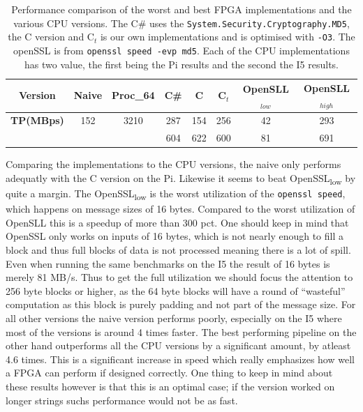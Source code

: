 \documentclass[a4paper, openany]{book}
\begin{document}
\begin{table}[!htb]
\centering
\captionsetup{width=.8\linewidth}
\begin{tabular}{c c c c c c c c}
\hline
\textbf{Version} & Naive & Proc_{64} & C\# & C & C$_{t}$ & OpenSLL$_{low}$ & OpenSLL$_{high}$\\
\hline
\textbf{TP(MBps)} & 152 & 3210 & 287 & 154 & 256 & 42 & 293\\
 & & & 604 & 622 & 600 & 81 & 691
\end{tabular}
\caption[MD5-versions]%
{Performance comparison of the worst and best FPGA implementations and the various CPU versions. The C\# uses the \texttt{System.Security.Cryptography.MD5}, the C version and C$_t$ is our own implementations and is optimised with \texttt{-O3}. The openSSL is from \texttt{openssl speed -evp md5}. Each of the CPU implementations has two value, the first being the Pi results and the second the I5 results.}
\label{tab:MD5compare}
\end{table}
Comparing the implementations to the CPU versions, the naive only performs adequatly with the C version on the Pi. Likewise it seems to beat OpenSSL\textsubscript{low} by quite a margin. The OpenSSL\textsubscript{low} is the worst utilization of the \texttt{openssl speed}, which happens on message sizes of 16 bytes. Compared to the worst utilization of OpenSLL this is a speedup of more than 300 pct. One should keep in mind that OpenSSL only works on inputs of 16 bytes, which is not nearly enough to fill a block and thus full blocks of data is not processed meaning there is a lot of spill. Even when running the same benchmarks on the I5 the result of 16 bytes is merely 81 MB/s. Thus to get the full utilization we should focus the attention to 256 byte blocks or higher, as the 64 byte blocks will have a round of ``wasteful'' computation as this block is purely padding and not part of the message size.
For all other versions the naive version performs poorly, especially on the I5 where most of the versions is around 4 times faster. The best performing pipeline on the other hand outperforms all the CPU versions by a significant amount, by atleast 4.6 times. This is a significant increase in speed which really emphasizes how well a FPGA can perform if designed correctly. One thing to keep in mind about these results however is that this is an optimal case; if the version worked on longer strings suchs performance would not be as fast.
\end{document}
